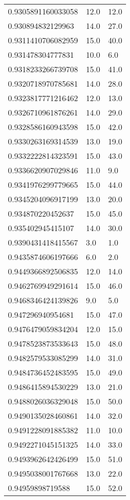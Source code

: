 \begin{center}
\begin{supertabular}[H]{p{0.30\textwidth}p{0.05\textwidth}p{0.05\textwidth}}
0.9305891160033058 & 12.0 & 12.0 \\ 
0.930894832129963 & 14.0 & 27.0 \\ 
0.9311410706082959 & 15.0 & 40.0 \\ 
0.931478304777831 & 10.0 & 6.0 \\ 
0.9318233266739708 & 15.0 & 41.0 \\ 
0.9320718970785681 & 14.0 & 28.0 \\ 
0.9323817771216462 & 12.0 & 13.0 \\ 
0.9326710961876261 & 14.0 & 29.0 \\ 
0.9328586160943598 & 15.0 & 42.0 \\ 
0.9330263169314539 & 13.0 & 19.0 \\ 
0.9332222814323591 & 15.0 & 43.0 \\ 
0.9336620907029846 & 11.0 & 9.0 \\ 
0.9341976299779665 & 15.0 & 44.0 \\ 
0.9345204096917199 & 13.0 & 20.0 \\ 
0.934870220452637 & 15.0 & 45.0 \\ 
0.935402945415107 & 14.0 & 30.0 \\ 
0.9390431418415567 & 3.0 & 1.0 \\ 
0.9435874606197666 & 6.0 & 2.0 \\ 
0.9449366892506835 & 12.0 & 14.0 \\ 
0.9462769949291614 & 15.0 & 46.0 \\ 
0.9468346424139826 & 9.0 & 5.0 \\ 
0.947296940954681 & 15.0 & 47.0 \\ 
0.9476479059834204 & 12.0 & 15.0 \\ 
0.9478523873533643 & 15.0 & 48.0 \\ 
0.9482579533085299 & 14.0 & 31.0 \\ 
0.9484736452483595 & 15.0 & 49.0 \\ 
0.9486415894530229 & 13.0 & 21.0 \\ 
0.9488026036329048 & 15.0 & 50.0 \\ 
0.9490135028460861 & 14.0 & 32.0 \\ 
0.9491228091885382 & 11.0 & 10.0 \\ 
0.9492271045151325 & 14.0 & 33.0 \\ 
0.9493962642426499 & 15.0 & 51.0 \\ 
0.9495038001767668 & 13.0 & 22.0 \\ 
0.94959898719588 & 15.0 & 52.0 \\ 

\end{supertabular}
\end{center}
